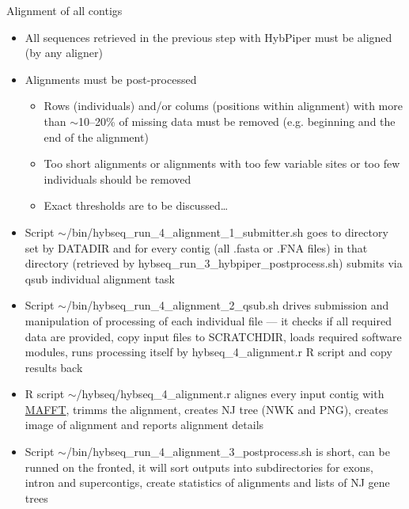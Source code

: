 \documentclass[compress, ucs, xelatex, 11pt, xcolor=x11names, aspectratio=169,
	hyperref={
		bookmarks=true,
		unicode=true,
		colorlinks=true,
		pdftitle={HybSeq course},
		plainpages=false,
		pdfauthor={Vojtech Zeisek},
		pdfsubject={Practical processing of HybSeq target enrichment sequencing data on computing grids like MetaCentrum},
		pdfcreator={XeLaTeX},
		pdfkeywords={BASH, command line, GNU, HybSeq, Linux, MetaCentrum, sequencing shell, target enrichment},
		linkcolor=Turquoise4, %
		anchorcolor=DodgerBlue4, %
		citecolor=DodgerBlue4, %
		filecolor=DodgerBlue4, %
		menucolor=Tan4, %
		urlcolor=DarkOliveGreen4, %
		pdftex},
	url={hyphens, lowtilde} %
	]{beamer}
\renewcommand{\texttt}[1]{\colorbox{Cornsilk2}{{\ttfamily #1}}}
\begin{document}
\begin{frame}[allowframebreaks]{Alignment of all contigs}
	\begin{itemize}
		\item All sequences retrieved in the previous step with HybPiper must be aligned (by any aligner)
		\item Alignments must be post-processed
		\begin{itemize}
			\item Rows (individuals) and/or colums (positions within alignment) with more than $\sim$10--20\% of missing data must be removed (e.g. beginning and the end of the alignment)
			\item Too short alignments or alignments with too few variable sites or too few individuals should be removed
			\item Exact thresholds are to be discussed\ldots
		\end{itemize}
		\item Script \texttt{$\sim$/bin/hybseq\_run\_4\_alignment\_1\_submitter.sh} goes to directory set by \texttt{DATADIR} and for every contig (all \texttt{*.fasta} or \texttt{*.FNA} files) in that directory (retrieved by \texttt{hybseq\_run\_3\_hybpiper\_postprocess.sh}) submits via \texttt{qsub} individual alignment task
		\item Script \texttt{$\sim$/bin/hybseq\_run\_4\_alignment\_2\_qsub.sh} drives submission and manipulation of processing of each individual file --- it checks if all required data are provided, copy input files to \texttt{SCRATCHDIR}, loads required software modules, runs processing itself by \texttt{hybseq\_4\_alignment.r} \texttt{R} script and copy results back
		\item \texttt{R} script \texttt{$\sim$/hybseq/hybseq\_4\_alignment.r} alignes every input contig with \href{https://mafft.cbrc.jp/alignment/software/}{MAFFT}, trimms the alignment, creates NJ tree (NWK and PNG), creates image of alignment and reports alignment details
		\item Script \texttt{$\sim$/bin/hybseq\_run\_4\_alignment\_3\_postprocess.sh} is short, can be runned on the fronted, it will sort outputs into subdirectories for exons, intron and supercontigs, create statistics of alignments and lists of NJ gene trees
	\end{itemize}
\end{frame}
\end{document}
